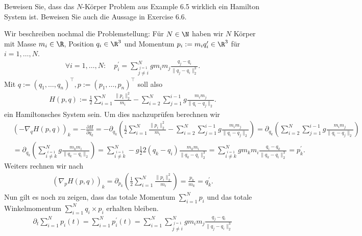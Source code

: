 \begin{exercise}
  Beweisen Sie, dass das $N$-Körper Problem aus Example 6.5
  wirklich ein Hamilton System ist. Beweisen Sie auch die
  Aussage in Exercise 6.6.
\end{exercise}

\begin{solution}
  Wir beschreiben nochmal die Problemstellung: Für $N \in \N$ haben wir $N$ Körper
  mit Masse $m_i \in \R$, Position $q_i \in \R^3$ und Momentum $p_i := m_iq_i^{\prime} \in \R^3$
  für $i = 1,\dots,N$.
  \begin{align*}
    \forall i = 1,\dots,N: \quad p_i^{\prime} = \sum_{\stackrel{j = 1}{j \neq i}}^N gm_im_j \frac{q_j - q_i}{\|q_j - q_i\|_2^3}.
  \end{align*}
  Mit $q := (q_1,\dots,q_n)^{\top}, p := (p_1,\dots,p_n)^{\top}$ soll also
  \begin{align*}
    H(p,q) := \frac{1}{2}\sum_{i=1}^N \frac{\|p_i\|_2^2}{m_i}- \sum_{i = 2}^N\sum_{j=1}^{i-1}g\frac{m_im_j}{\|q_i-q_j\|_2}.
  \end{align*}
  ein Hamiltonsches System sein. Um dies nachzuprüfen berechnen wir
  \begin{align*}
     & \left(- \nabla_q H(p,q)\right)_k = - \frac{\partial H}{\partial q_k}
    = -\partial_{q_k}\left(\frac{1}{2}\sum_{i=1}^N \frac{\|p_i\|_2^2}{m_i}- \sum_{i = 2}^N\sum_{j=1}^{i-1}g\frac{m_im_j}{\|q_i-q_j\|_2}\right)
    = \partial_{q_k}\left(\sum_{i = 2}^N\sum_{j=1}^{i-1}g\frac{m_im_j}{\|q_i-q_j\|_2}\right) \\
    &= \partial_{q_k}\left(\sum_{\stackrel{i = 1}{i \neq k}}^{N}g\frac{m_km_i}{\|q_k-q_i\|_2}\right)
    = \sum_{\stackrel{i = 1}{i \neq k}}^{N}-g\frac{1}{2}2(q_k - q_i)\frac{m_km_i}{\|q_k-q_i\|_2^3}
    = \sum_{\stackrel{i = 1}{i \neq k}}^{N}gm_km_i\frac{q_i - q_k}{\|q_k-q_i\|_2^3} = p_k^{\prime}.
  \end{align*}
  Weiters rechnen wir nach
  \begin{align*}
    \left(\nabla_p H(p,q)\right)_k = \partial_{p_k}\left(\frac{1}{2}\sum_{i=1}^N \frac{\|p_i\|_2^2}{m_i}\right)
    = \frac{p_k}{m_k} = q_k^{\prime}.
  \end{align*}
  Nun gilt es noch zu zeigen, dass das totale Momentum $\sum_{i=1}^N p_i$
  und das totale Winkelmomentum $\sum_{i=1}^N q_i \times p_i$ erhalten bleiben.
  \begin{align*}
    \partial_t \sum_{i=1}^N p_i(t) = \sum_{i=1}^N p_i^{\prime}(t)
    = \sum_{i=1}^N \sum_{\stackrel{j = 1}{j \neq i}}^N gm_im_j \frac{q_j - q_i}{\|q_j - q_i\|_2^3}

\end{align*}
\end{solution}
